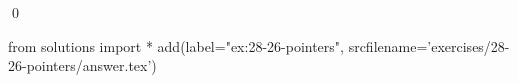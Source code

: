 
\begin{ex}
  \label{ex:28-26-pointers}
  
  \qed
\end{ex}
\begin{python0}
from solutions import *
add(label="ex:28-26-pointers",
    srcfilename='exercises/28-26-pointers/answer.tex')
\end{python0}
